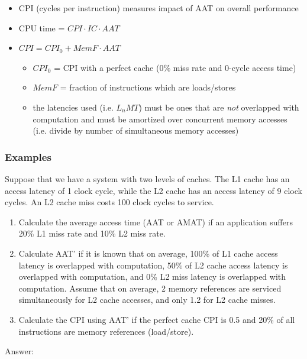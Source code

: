 \documentclass[12pt]{extarticle}
\begin{document}
	\begin{itemize}
		\item CPI (cycles per instruction) measures impact of AAT on overall performance
		\item CPU time = $CPI \cdot IC \cdot AAT$
		\item $CPI = CPI_0 + MemF \cdot AAT$
		\begin{itemize}
			\item $CPI_0$ = CPI with a perfect cache (0\% miss rate and 0-cycle access time)
			\item $MemF$ = fraction of instructions which are loads/stores
			\item the latencies used (i.e. $L_nMT$) must be ones that are \textit{not} overlapped with computation and 
			must be amortized over concurrent memory accesses (i.e. divide by number of simultaneous memory accesses)
		\end{itemize}
	\end{itemize}

	\subsubsection{Examples}

	Suppose that we have a system with two levels of caches. The L1 cache has an access latency of 1 clock cycle, while 
	the L2 cache has an access latency of 9 clock cycles. An L2 cache miss costs 100 clock cycles to service.
	
	\begin{enumerate}
		\item Calculate the average access time (AAT or AMAT) if an application suffers 20\% L1 miss rate and 10\% L2 miss rate.
		\item Calculate AAT' if it is known that on average, 100\% of L1 cache access latency is overlapped with computation, 
		50\% of L2 cache access latency is overlapped with computation, and 0\% L2 miss latency is overlapped with computation. 
		Assume that on average, 2 memory references are serviced simultaneously for L2 cache accesses, and only 1.2 for 
		L2 cache misses.
		\item Calculate the CPI using AAT' if the perfect cache CPI is 0.5 and 20\% of all instructions are memory 
		references (load/store).
	\end{enumerate}

	\noindent Answer:
\end{document}
